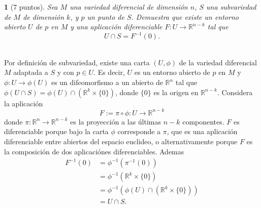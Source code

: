 \documentclass[12pt,a4paper]{report}
\theoremstyle{definition}
\newtheorem{ex}{}
\newcommand{\RR}{\ensuremath{\mathbb R}}
\begin{document}
\begin{ex}[7 puntos]\emph{
Sea $M$ una variedad diferencial de dimensi\'on $n$, $S$  una subvariedad de $M$ de dimensi\'on $k$, y $p$ un punto de $S$. Demuestra que existe un entorno abierto $U$ de $p$ en $M$ y una aplicaci\'on diferenciable $F \colon U \to \RR^{n-k}$ tal que
$$U\cap S= F^{-1}(0).$$\\
}

Por definici\'on de subvariedad, existe una carta $(U,\phi)$ de la variedad diferencial $M$ adaptada a $S$ y con $p\in U$. Es decir, $U$ es un entorno abierto de $p$ en $M$ y $\phi \colon U \to \phi(U)$ es un difeomorfismo a un abierto de $\RR^n$   tal que $\phi(U\cap S)=\phi(U)\cap (\RR^{k}\times \{0\})$, donde $\{0\}$ es la origen en $\RR^{n-k}$. Considera la aplicaci\'on $$F:= \pi \circ \phi \colon U \to \RR^{n-k}$$ donde $\pi \colon \RR^{n}\to \RR^{n-k}$ es la proyecci\'on a las \'ultimas $n-k$ componentes. $F$ es diferenciable porque bajo la carta $\phi$ corresponde  a $\pi$, que es una aplicaci\'on diferenciable entre abiertos del espacio euclideo, o alternativamente porque $F$ es la composici\'on de dos aplicaci\'ones diferenciables.
Ademas \begin{align*}
F^{-1}(0)&=\phi^{-1}(\pi^{-1}(0))\\
&=\phi^{-1}(\RR^{k}\times \{0\})\\
&=\phi^{-1}(\phi(U)\cap (\RR^{k}\times \{0\})    )\\
&= U\cap S.   
\end{align*}
\end{ex}

 







 
\end{document}

